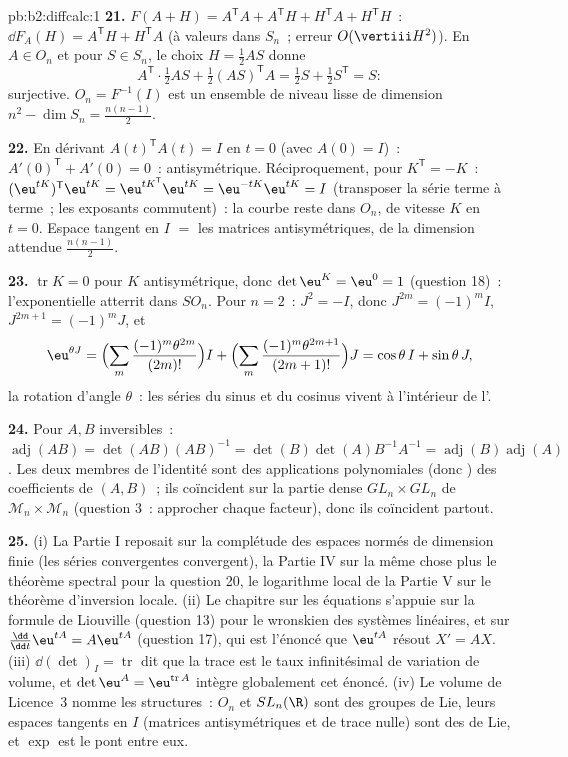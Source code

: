 \begin{solution}{pb:b2:diffcalc:1}
\textbf{21.} $F(A + H) = A^{\mathsf T}A + A^{\mathsf T}H +
H^{\mathsf T}A + H^{\mathsf T}H$~: $\dd F_A(H) =
A^{\mathsf T}H + H^{\mathsf T}A$ (à valeurs dans $S_n$~; erreur
$O(\vertiii H^2)$). En $A \in O_n$ et pour $S \in S_n$, le
choix $H = \frac12AS$ donne
\[
A^{\mathsf T}\cdot\tfrac12AS + \tfrac12(AS)^{\mathsf T}A
= \tfrac12 S + \tfrac12 S^{\mathsf T} = S :
\]
surjective. $O_n = F^{-1}(I)$ est un ensemble de niveau lisse de
dimension $n^2 - \dim S_n = \frac{n(n-1)}2$.

\textbf{22.} En dérivant $A(t)^{\mathsf T}A(t) = I$ en $t
= 0$ (avec $A(0) = I$)~: $A'(0)^{\mathsf T} + A'(0) = 0$~:
antisymétrique. Réciproquement, pour $K^{\mathsf T} = -K$~:
$(\eu^{tK})^{\mathsf T}\eu^{tK} = \eu^{tK^{\mathsf T}}
\eu^{tK} = \eu^{-tK}\eu^{tK} = I$ (transposer la série
terme à terme~; les exposants commutent)~: la courbe reste dans
$O_n$, de vitesse $K$ en $t = 0$. Espace tangent en $I$ $=$ les
matrices antisymétriques, de la dimension attendue
$\frac{n(n-1)}2$.

\textbf{23.} $\operatorname{tr}K = 0$ pour $K$ antisymétrique,
donc $\det\eu^K = \eu^0 = 1$ (question 18)~: l'exponentielle
atterrit dans $SO_n$. Pour $n = 2$~: $J^2 = -I$, donc $J^{2m} =
(-1)^mI$, $J^{2m+1} = (-1)^mJ$, et
\[
\eu^{\theta J}
= \Bigl(\sum_m\frac{(-1)^m\theta^{2m}}{(2m)!}\Bigr)I
+ \Bigl(\sum_m\frac{(-1)^m\theta^{2m+1}}{(2m+1)!}\Bigr)J
= \cos\theta\,I + \sin\theta\,J ,
\]
la rotation d'angle $\theta$~: les séries du sinus et du cosinus
vivent à l'intérieur de l'.

\textbf{24.} Pour $A, B$ inversibles~: $\operatorname{adj}(AB) =
\det(AB)(AB)^{-1} = \det(B)\det(A)B^{-1}A^{-1} =
\operatorname{adj}(B)\operatorname{adj}(A)$. Les deux membres de
l'identité sont des applications polynomiales (donc ) des
coefficients de $(A, B)$~; ils coïncident sur la partie dense
$GL_n\times GL_n$ de $\mathcal M_n\times\mathcal M_n$ (question 3~:
approcher chaque facteur), donc ils coïncident partout.

\textbf{25.} (i) La Partie I reposait sur la complétude des espaces
normés de dimension finie (les séries  convergentes
convergent), la Partie IV sur la même chose plus le théorème
spectral pour la question 20, le logarithme local de la Partie V sur
le théorème d'inversion locale. (ii) Le chapitre sur les équations
 s'appuie sur la formule de Liouville (question 13)
pour le wronskien des systèmes linéaires, et sur
$\frac{\dd}{\dd t}\eu^{tA} = A\eu^{tA}$ (question 17), qui est
l'énoncé que $\eu^{tA}$ résout $X' = AX$. (iii)
$\dd(\det)_I = \operatorname{tr}$ dit que la trace est le taux
infinitésimal de variation de volume, et $\det\eu^A =
\eu^{\operatorname{tr}A}$ intègre globalement cet énoncé.
(iv) Le volume de Licence~3 nomme les structures~: $O_n$ et
$SL_n(\R)$ sont des groupes de Lie, leurs espaces tangents en $I$
(matrices antisymétriques et de trace nulle) sont des  de
Lie, et $\exp$ est le pont entre eux.
\end{solution}

